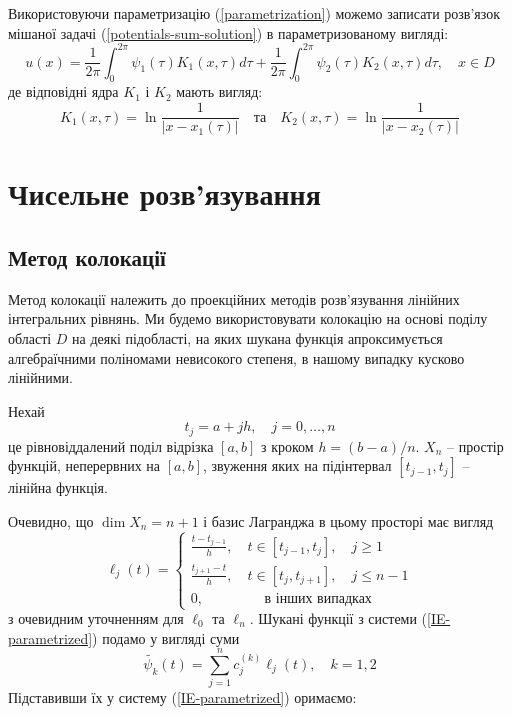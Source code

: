 \documentclass[14pt,a4paper]{extarticle}
\newcounter{e}
\numberwithin{equation}{section}
\begin{document}
 Використовуючи параметризацію (\ref{parametrization}) можемо записати розв'язок мішаної задачі (\ref{potentials-sum-solution}) в параметризованому вигляді:
 $$
 u(x)=\frac{1}{2 \pi} \int_{0}^{2 \pi} \psi_{1}(\tau) K_{1}(x, \tau) d \tau+\frac{1}{2 \pi} \int_{0}^{2 \pi} \psi_{2}(\tau) K_{2}(x, \tau) d \tau, \quad x \in D
 $$
 де відповідні ядра $K_{1}$ і $K_{2}$ мають вигляд:
 $$
  	K_{1}(x, \tau)=\ln \frac{1}{\left|x-x_{1}(\tau)\right|}
  	\quad \text{та} \quad 
 	K_{2}(x, \tau)=\ln \frac{1}{\left|x-x_{2}(\tau)\right|}
 $$
 
 
 
 
 \newpage
 \thispagestyle{empty}
 \section{Чисельне розв'язування}
 
 \subsection{Метод колокації}
 Метод колокації належить до проекційних методів розв'язування лінійних інтегральних рівнянь. Ми будемо використовувати колокацію на основі поділу області $D$ на деякі підобласті, на яких шукана функція апроксимується алгебраїчними поліномами невисокого степеня, в нашому випадку кусково лінійними.
 
 Нехай
 \begin{equation}
 	\label{tabulation}
 	t_{j}=a+j h, \quad j=0, \ldots, n
 \end{equation} 
 це рівновіддалений поділ відрізка $[a, b]$ з кроком $h=(b-a) / n$. $X_{n} $ -- простір функцій, неперервних на $[a, b]$, звуження яких на підінтервал $[t_{j-1}, t_{j}]$ -- лінійна функція.
 
 Очевидно, що $\dim X_n = n+1$ і базис Лагранджа в цьому просторі має вигляд
 \begin{equation}
	 \label{basis}
	 \ell_{j}(t)=\left\{
	 \begin{array}{lc}
	 	\displaystyle
	 	\frac{t-t_{j-1}}{h}, \quad t \in\left[t_{j-1}, t_{j}\right], \quad j \geq 1 \\
	 	\displaystyle
	 	\frac{t_{j+1}-t}{h}, \quad t \in\left[t_{j}, t_{j+1}\right], \quad j \leq n-1 \\
	 	0, \qquad\qquad \text { в інших випадках }
	 \end{array}\right.
 \end{equation}
 з очевидним уточненням для $\ell_0$ та $\ell_n$.
 Шукані функції з системи (\ref{IE-parametrized}) подамо у вигляді суми
 \begin{equation}
 	\tilde{\psi_k}(t)=\sum_{j=1}^{n} c^{(k)}_{j} \ell_{j}(t), \quad k = 1,2
 \end{equation}
 Підставивши їх у систему (\ref{IE-parametrized}) оримаємо:
 
\end{document}
